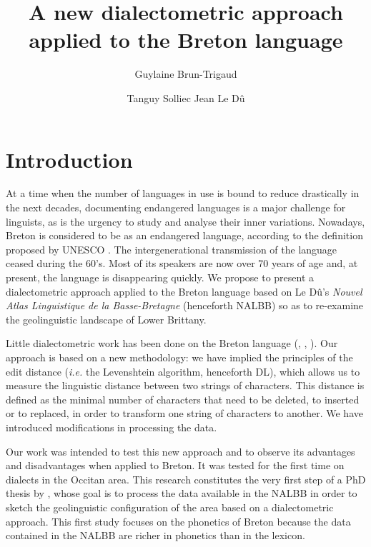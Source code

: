 \documentclass[output=paper]{LSP/langsci}
\author{Guylaine Brun-Trigaud\affiliation{CNRS \& Université de Nice-Sophia-Antipolis, France} \and Tanguy Solliec\affiliation{Université de Paris Descartes, France} \lastand Jean Le Dû\affiliation{Université de Bretagne Occidentale, France}}
\title{A new dialectometric approach applied to the Breton language}
\begin{document}
 

% 
% 

 

\section{Introduction}

At a time when the number of languages in use is bound to reduce drastically in the next decades, documenting endangered languages is a major challenge for linguists, as is the urgency to study and analyse their inner variations. Nowadays, Breton is considered to be as an endangered language, according to the definition proposed by UNESCO \citep{moseley_atlas_2010}. The intergenerational transmission of the language ceased during the 60’s. Most of its speakers are now over 70 years of age and, at present, the language is disappearing quickly. We propose to present a dialectometric approach applied to the Breton language based on Le Dû’s \textit{Nouvel Atlas Linguistique de la Basse-Bretagne} (henceforth NALBB) \cite{le_du_nouvel_2001} so as to re-examine the geolinguistic landscape of Lower Brittany.

Little dialectometric work has been done on the Breton language (\citealt{german_etude_1984}, \citealt{german_methode_1991}, \citealt{costaouec_linguistic_2012}). Our approach is based on a new methodology: we have implied the principles of the edit distance (\textit{i.e.} the Levenshtein algorithm, henceforth DL), which allows us to measure the linguistic distance between two strings of characters. This distance is defined as the minimal number of characters that need to be deleted, to inserted or to replaced, in order to transform one string of characters to another. We have introduced modifications in processing the data.

Our work was intended to test this new approach and to observe its advantages and disadvantages when applied to Breton. It was tested for the first time on dialects in the Occitan area. This research constitutes the very first step of a PhD thesis by \citet{solliec_dialectometrie_2014}, whose goal is to process the data available in the NALBB in order to sketch the geolinguistic configuration of the area based on a dialectometric approach. This first study focuses on the phonetics of Breton because the data contained in the NALBB are richer in phonetics than in the lexicon.
\end{document}
